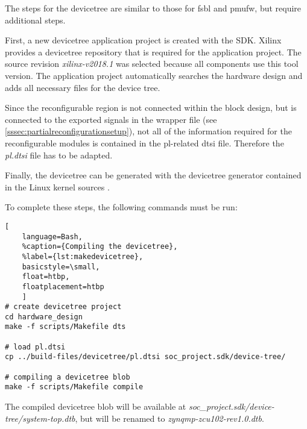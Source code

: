 The steps for the devicetree are similar to those for \gls{fsbl} and \gls{pmufw}, but require additional steps.

First, a new devicetree application project is created with the SDK. Xilinx provides a devicetree repository \cite{devicetree} that is required for the application project. The source revision \emph{xilinx-v2018.1} was selected because all components use this tool version. The application project automatically searches the hardware design and adds all necessary files for the device tree.

Since the reconfigurable region is not connected within the block design, but is connected to the exported signals in the wrapper file (see \cref{sssec:partialreconfigurationsetup}), not all of the information required for the reconfigurable modules is contained in the \gls{pl}-related \gls{dtsi} file. Therefore the \emph{pl.dtsi} file has to be adapted.

Finally, the devicetree can be generated with the devicetree generator contained in the Linux kernel sources \cite{linuxkernel}.

To complete these steps, the following commands must be run:
\begin{lstlisting}[
	language=Bash,
	%caption={Compiling the devicetree},
	%label={lst:makedevicetree},
	basicstyle=\small,
	float=htbp,
	floatplacement=htbp
	]
# create devicetree project
cd hardware_design
make -f scripts/Makefile dts

# load pl.dtsi
cp ../build-files/devicetree/pl.dtsi soc_project.sdk/device-tree/

# compiling a devicetree blob
make -f scripts/Makefile compile
\end{lstlisting}
\FloatBarrier

The compiled devicetree blob will be available at \emph{soc_project.sdk/device-tree/system-top.dtb}, but will be renamed to \emph{zynqmp-zcu102-rev1.0.dtb}.